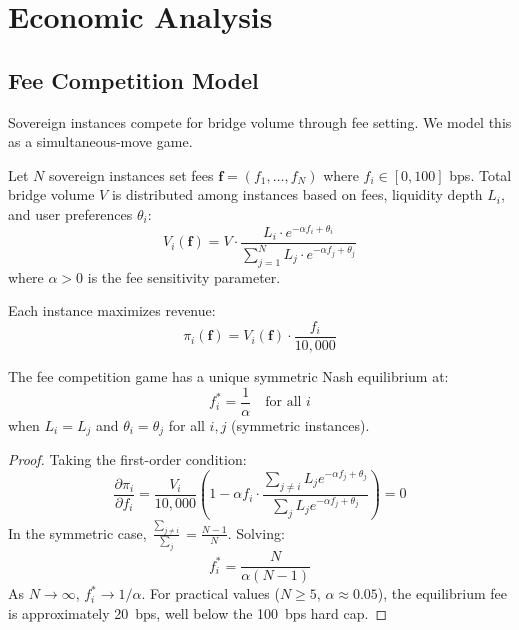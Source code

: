 \section{Economic Analysis}

\label{sec:economics}

\subsection{Fee Competition Model}

Sovereign instances compete for bridge volume through fee setting. We model this as a simultaneous-move game.

\begin{definition}
\label{def:game}
Let $N$ sovereign instances set fees $\mathbf{f} = (f_1, \ldots, f_N)$ where $f_i \in [0, 100]$ bps. Total bridge volume $V$ is distributed among instances based on fees, liquidity depth $L_i$, and user preferences $\theta_i$:
\begin{equation}
  V_i(\mathbf{f}) = V \cdot \frac{L_i \cdot e^{-\alpha f_i + \theta_i}}{\sum_{j=1}^{N} L_j \cdot e^{-\alpha f_j + \theta_j}}
\end{equation}
where $\alpha > 0$ is the fee sensitivity parameter.
\end{definition}

Each instance maximizes revenue:
\begin{equation}
  \pi_i(\mathbf{f}) = V_i(\mathbf{f}) \cdot \frac{f_i}{10{,}000}
\end{equation}

\begin{theorem}
\label{thm:nash}
The fee competition game has a unique symmetric Nash equilibrium at:
\begin{equation}
  f_i^* = \frac{1}{\alpha} \quad \text{for all } i
\end{equation}
when $L_i = L_j$ and $\theta_i = \theta_j$ for all $i, j$ (symmetric instances).
\end{theorem}

\begin{proof}
Taking the first-order condition:
\begin{equation}
  \frac{\partial \pi_i}{\partial f_i} = \frac{V_i}{10{,}000} \left(1 - \alpha f_i \cdot \frac{\sum_{j \neq i} L_j e^{-\alpha f_j + \theta_j}}{\sum_j L_j e^{-\alpha f_j + \theta_j}}\right) = 0
\end{equation}
In the symmetric case, $\frac{\sum_{j \neq i}}{\sum_j} = \frac{N-1}{N}$. Solving:
\begin{equation}
  f_i^* = \frac{N}{\alpha(N-1)}
\end{equation}
As $N \to \infty$, $f_i^* \to 1/\alpha$. For practical values ($N \geq 5$, $\alpha \approx 0.05$), the equilibrium fee is approximately 20~bps, well below the 100~bps hard cap.
\end{proof}

